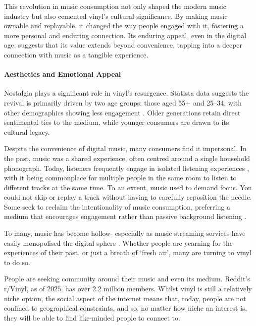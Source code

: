             This revolution in music consumption not only shaped the modern music industry but also cemented vinyl’s cultural significance. By making music ownable and replayable, it changed the way people engaged with it, fostering a more personal and enduring connection. Its enduring appeal, even in the digital age, suggests that its value extends beyond convenience, tapping into a deeper connection with music as a tangible experience.
    
            \paragraph{Aesthetics and Emotional Appeal}
    
                Nostalgia plays a significant role in vinyl's resurgence. Statista data suggests the revival is primarily driven by two age groups: those aged 55+ and 25--34, with other demographics showing less engagement \cite{Gotting2021}. Older generations retain direct sentimental ties to the medium, while younger consumers are drawn to its cultural legacy.
    
                Despite the convenience of digital music, many consumers find it impersonal. In the past, music was a shared experience, often centred around a single household phonograph. Today, listeners frequently engage in isolated listening experiences \cite{historyandrevivalofvinyls}, with it being commonplace for multiple people in the same room to listen to different tracks at the same time. To an extent, music used to demand focus. You could not skip or replay a track without having to carefully reposition the needle. Some seek to reclaim the intentionality of music consumption, preferring a medium that encourages engagement rather than passive background listening \cite{Liu2020}.
    
                To many, music has become hollow- especially as music streaming services have easily monopolised the digital sphere \cite{historyandrevivalofvinyls}. Whether people are  yearning for the experiences of their past, or just a breath of `fresh air', many are turning to vinyl to do so.
    
                People are seeking community around their music and even its medium. Reddit's r/Vinyl, as of 2025, has over 2.2 million members. Whilst vinyl is still a relatively niche option, the social aspect of the internet means that, today, people are not confined to geographical constraints, and so, no matter how niche an interest is, they will be able to find like-minded people to connect to.
          

